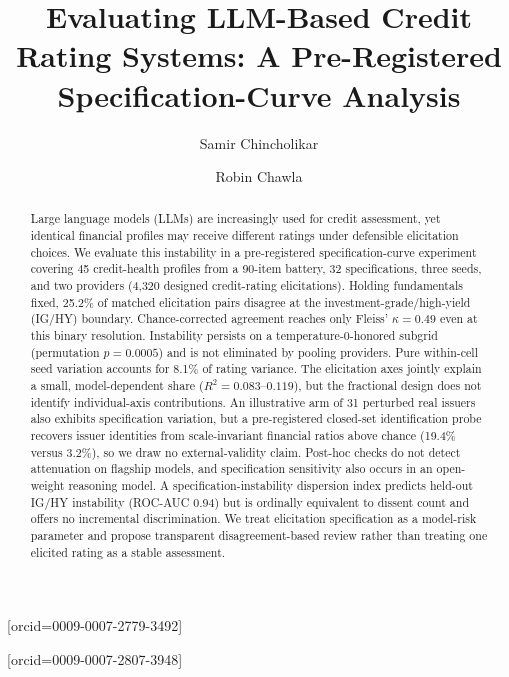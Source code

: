 \documentclass[a4paper,fleqn]{cas-sc}
\begin{document}
\let\WriteBookmarks\relax
\def\floatpagepagefraction{1}
\def\textpagefraction{.001}


\title[mode=title]{Evaluating LLM-Based Credit Rating Systems: A Pre-Registered Specification-Curve Analysis}

\author[1]{Samir Chincholikar}[orcid=0009-0007-2779-3492]

\author[1]{Robin Chawla}[orcid=0009-0007-2807-3948]
\cormark[1]



\begin{abstract}
Large language models (LLMs) are increasingly used for credit assessment, yet identical financial
profiles may receive different ratings under defensible elicitation choices. We evaluate this
instability in a pre-registered specification-curve experiment covering 45 credit-health profiles
from a 90-item battery, 32 specifications, three seeds, and two providers (4{,}320 designed
credit-rating elicitations). Holding fundamentals fixed, 25.2\% of matched elicitation pairs
disagree at the investment-grade/high-yield (IG/HY) boundary. Chance-corrected agreement reaches
only Fleiss' $\kappa=0.49$ even at this binary resolution. Instability persists on a
temperature-0-honored subgrid (permutation $p=0.0005$) and is not eliminated by pooling providers.
Pure within-cell seed variation accounts for 8.1\% of rating variance. The elicitation axes jointly
explain a small, model-dependent share ($R^2=0.083$--$0.119$), but the fractional design does not
identify individual-axis contributions. An illustrative arm of 31 perturbed real issuers also
exhibits specification variation, but a pre-registered closed-set identification probe recovers
issuer identities from scale-invariant financial ratios above chance (19.4\% versus 3.2\%), so we
draw no external-validity claim. Post-hoc checks do not detect attenuation on flagship models, and
specification sensitivity also occurs in an open-weight reasoning model. A specification-instability
dispersion index predicts held-out IG/HY instability (ROC-AUC 0.94) but is ordinally equivalent to
dissent count and offers no incremental discrimination. We treat elicitation specification as a
model-risk parameter and propose transparent disagreement-based review rather than treating one
elicited rating as a stable assessment.
\end{abstract}
\end{document}
